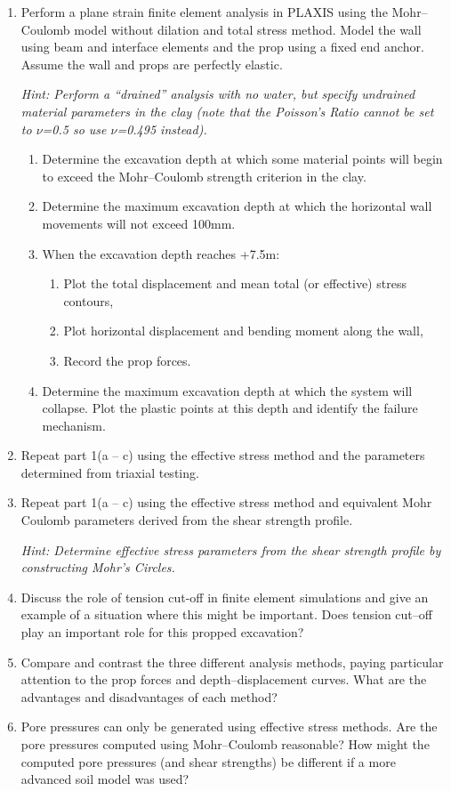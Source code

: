\documentclass[a4paper,12pt]{article}
\begin{document}
\begin{enumerate}
	\item
	Perform a plane strain finite element analysis in PLAXIS using the Mohr--Coulomb model without dilation and total stress method. Model the wall using beam and interface elements and the prop using a fixed end anchor. Assume the wall and props are perfectly elastic.
	
	\textit{Hint: Perform a ``drained'' analysis with no water, but specify undrained material parameters in the clay (note that the Poisson's Ratio cannot be set to $\nu$=0.5 so use $\nu$=0.495 instead).}
	\begin{enumerate}
		\item
		Determine the excavation depth at which some material points will begin to exceed the Mohr--Coulomb strength criterion in the clay.
		\item
		Determine the maximum excavation depth at which the horizontal wall movements will not exceed 100mm.
		\item
		When the excavation depth reaches +7.5m:
		\begin{enumerate}
			\item
			Plot the total displacement and mean total (or effective) stress contours,
			\item
			Plot horizontal displacement and bending moment along the wall,
			\item
			Record the prop forces.
		\end{enumerate}
		\item
		Determine the maximum excavation depth at which the system will collapse. Plot the plastic points at this depth and identify the failure mechanism.
	\end{enumerate}
	\item
	Repeat part 1(a -- c) using the effective stress method and the parameters determined from triaxial testing.
	\item
	Repeat part 1(a -- c) using the effective stress method and equivalent Mohr Coulomb parameters derived from the shear strength profile.
	
	\textit{Hint: Determine effective stress parameters from the shear strength 
		profile by constructing Mohr's Circles.}
	
	\item
	Discuss the role of tension cut-off in finite element simulations and give an example of a situation where this might be important. Does tension cut--off play an important role for this propped excavation?
	\item
	Compare and contrast the three different analysis methods, paying particular attention to the prop forces and depth--displacement curves. What are the advantages and disadvantages of each method?
	\item
	Pore pressures can only be generated using effective stress methods. Are the pore pressures computed using Mohr--Coulomb reasonable? How might the computed pore pressures (and shear strengths) be different if a more advanced soil model was used?
\end{enumerate}
\end{document}
